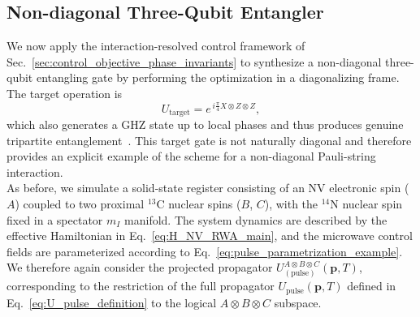 
\subsection{Non-diagonal Three-Qubit Entangler}
\label{sec:results_nv_xzz}

\noindent
We now apply the interaction-resolved control framework of Sec.~\ref{sec:control_objective_phase_invariants} to synthesize a non-diagonal three-qubit entangling gate by performing the optimization in a diagonalizing frame. The target operation is
\begin{equation}
\label{eq:desired_u_nondiag}
U_{\mathrm{target}} = e^{\,i\frac{\pi}{4}X\!\otimes\!Z\!\otimes\!Z},
\end{equation}
which also generates a GHZ state up to local phases and thus produces genuine tripartite entanglement~\cite{coffman2000distributed,dur2000three}. This target gate is not naturally diagonal and therefore provides an explicit example of the scheme for a non-diagonal Pauli-string interaction. \\


\noindent
As before, we simulate a solid-state register consisting of an NV electronic spin ($A$) coupled to two proximal $^{13}$C nuclear spins ($B$, $C$), with the $^{14}$N nuclear spin fixed in a spectator $m_I$ manifold. The system dynamics are described by the effective Hamiltonian in Eq.~\eqref{eq:H_NV_RWA_main}, and the microwave control fields are parameterized according to Eq.~\eqref{eq:pulse_parametrization_example}. We therefore again consider the projected propagator $U^{A\otimes B\otimes C}_{(\mathrm{pulse})}(\mathbf p,T)$, corresponding to the restriction of the full propagator $U_{\mathrm{pulse}}(\mathbf p,T)$ defined in Eq.~\eqref{eq:U_pulse_definition} to the logical $A\!\otimes\!B\!\otimes\!C$ subspace.\\


